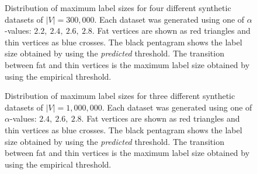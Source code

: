 \begin{figure}[!ht]
{}%
\caption{Distribution of maximum label sizes for four different synthetic datasets of $\vert V\vert = 300,000$. Each dataset was generated using one of $\alpha$-values: $2.2,~2.4,~2.6,~2.8$. Fat vertices are shown as red triangles and thin vertices as blue crosses. The black pentagram shows the label size obtained by using the \emph{predicted} threshold. The transition between fat and thin vertices is the maximum label size obtained by using the empirical threshold.}%
\label{fig:synthetic300}%
\end{figure}


\begin{figure}[!ht]
\centering
{}%
\quad
{}%
\caption{Distribution of maximum label sizes for three different synthetic datasets of $\vert V\vert = 1,000,000$. Each dataset was generated using one of $\alpha$-values: $2.4,~2.6,~2.8$. Fat vertices are shown as red triangles and thin vertices as blue crosses. The black pentagram shows the label size obtained by using the \emph{predicted} threshold. The transition between fat and thin vertices is the maximum label size obtained by using the empirical threshold.}%
\label{fig:synthetic1M}%
\end{figure}
\clearpage

